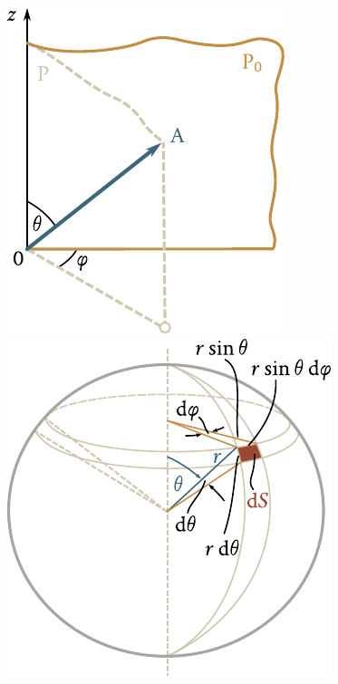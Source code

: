 \begin{figure}[t]
	\begin{minipage}[t]{0.5\linewidth}
		\begin{center}
			\includegraphics[scale=1.0]{figures/ch_11/fig_11_3.pdf}
			\caption[]{}
			\label{fig:11_3}
		\end{center}
	\end{minipage}
	\hspace{-0.05cm}
	\begin{minipage}[t]{0.5\linewidth}
		\begin{center}
			\includegraphics[scale=1.0]{figures/ch_11/fig_11_4.pdf}
			\caption[]{}
			\label{fig:11_4}
		\end{center}
	\end{minipage}
	\vspace{-0.4cm}
\end{figure}


